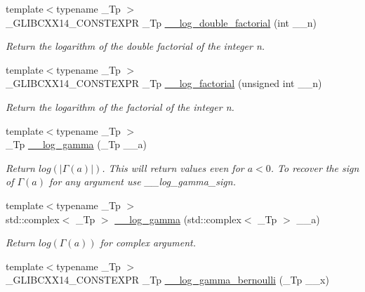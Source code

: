 \begin{DoxyCompactItemize}
\item 
{\footnotesize template$<$typename \+\_\+\+Tp $>$ }\\\+\_\+\+G\+L\+I\+B\+C\+X\+X14\+\_\+\+C\+O\+N\+S\+T\+E\+X\+PR \+\_\+\+Tp \hyperlink{namespacestd_1_1____detail_aa832ed1d29fd41c40cf892cc1feef7e9}{\+\_\+\+\_\+log\+\_\+double\+\_\+factorial} (int \+\_\+\+\_\+n)
\begin{DoxyCompactList}\small\item\em Return the logarithm of the double factorial of the integer n. \end{DoxyCompactList}\item 
{\footnotesize template$<$typename \+\_\+\+Tp $>$ }\\\+\_\+\+G\+L\+I\+B\+C\+X\+X14\+\_\+\+C\+O\+N\+S\+T\+E\+X\+PR \+\_\+\+Tp \hyperlink{namespacestd_1_1____detail_a2809419dbbe9fc60066dacfdc13761d4}{\+\_\+\+\_\+log\+\_\+factorial} (unsigned int \+\_\+\+\_\+n)
\begin{DoxyCompactList}\small\item\em Return the logarithm of the factorial of the integer n. \end{DoxyCompactList}\item 
{\footnotesize template$<$typename \+\_\+\+Tp $>$ }\\\+\_\+\+Tp \hyperlink{namespacestd_1_1____detail_af6c4c0192a07f467fd9ddeebb28a34d4}{\+\_\+\+\_\+log\+\_\+gamma} (\+\_\+\+Tp \+\_\+\+\_\+a)
\begin{DoxyCompactList}\small\item\em Return $ log(|\Gamma(a)|) $. This will return values even for $ a < 0 $. To recover the sign of $ \Gamma(a) $ for any argument use {\itshape \+\_\+\+\_\+log\+\_\+gamma\+\_\+sign}. \end{DoxyCompactList}\item 
{\footnotesize template$<$typename \+\_\+\+Tp $>$ }\\std\+::complex$<$ \+\_\+\+Tp $>$ \hyperlink{namespacestd_1_1____detail_ad37ad67a4b856eb97b13c8844f9ef8d8}{\+\_\+\+\_\+log\+\_\+gamma} (std\+::complex$<$ \+\_\+\+Tp $>$ \+\_\+\+\_\+a)
\begin{DoxyCompactList}\small\item\em Return $ log(\Gamma(a)) $ for complex argument. \end{DoxyCompactList}\item 
{\footnotesize template$<$typename \+\_\+\+Tp $>$ }\\\+\_\+\+G\+L\+I\+B\+C\+X\+X14\+\_\+\+C\+O\+N\+S\+T\+E\+X\+PR \+\_\+\+Tp \hyperlink{namespacestd_1_1____detail_ac13e31ebcd3c99d6a7cad9010e039315}{\+\_\+\+\_\+log\+\_\+gamma\+\_\+bernoulli} (\+\_\+\+Tp \+\_\+\+\_\+x)

\end{DoxyCompactItemize}

